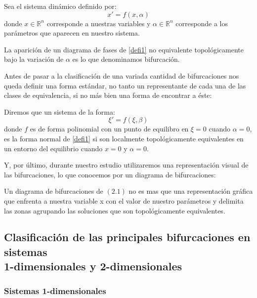  Sea el sistema dinámico definido por: 
 \begin{equation}
 x'=f(x,\alpha)
 \label{defi1}
 \end{equation}
 donde $x \in \mathbb{R}^n$ corresponde a nuestras variables y $\alpha \in \mathbb{R}^n$ corresponde a los parámetros que aparecen en nuestro sistema.
 \begin{defi}
 	La aparición de un diagrama de fases de \ref{defi1} no equivalente topológicamente bajo la variación de $\alpha$ es lo que denominamos bifurcación.
 \end{defi}
 
 Antes de pasar a la clasificación de una variada cantidad de bifurcaciones nos queda definir una forma estándar, no tanto un representante de cada una de las clases de equivalencia, si no más bien una forma de encontrar a éste:
 
 \begin{defi}
 	Diremos que un sistema de la forma: 
 	\begin{equation}
 	\xi'=f(\xi,\beta)
 	\end{equation}
 	donde $f$ es de forma polinomial con un punto de equilibro en $\xi=0$ cuando $\alpha=0$, es la forma normal de \ref{defi1} si son localmente topológicamente equivalentes en un entorno del equilibrio cuando $x=0$ y $\alpha=0$.
 \end{defi}
 
 Y, por último, durante nuestro estudio utilizaremos una representación visual de las bifurcaciones, lo que conocemos por un diagrama de bifurcaciones:
 \begin{defi}
 	Un diagrama de bifurcaciones de $(2.1)$ no es mas que una representación gráfica que enfrenta a nuestra variable x con el valor de nuestro parámetros y delimita las zonas agrupando las soluciones que son topológicamente equivalentes. 
 \end{defi}
 
 \subsection{Clasificación de las principales bifurcaciones en sistemas \\  1-dimensionales y 2-dimensionales}
 
 \subsubsection{Sistemas 1-dimensionales}
 
